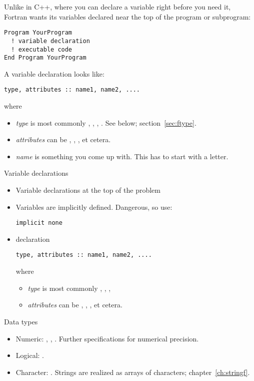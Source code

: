 Unlike in C++, where you can declare a variable right before you need
it, Fortran wants its variables declared near the top of the program
or subprogram:
\begin{verbatim}
Program YourProgram
  ! variable declaration
  ! executable code
End Program YourProgram
\end{verbatim}
A variable declaration looks like:
\begin{verbatim}
type, attributes :: name1, name2, ....
\end{verbatim}
where
\begin{itemize}
\item \textit{type} is most commonly , , ,
  . See below; section~\ref{sec:ftype}.
\item \textit{attributes} can be , ,
  ,  et cetera.
\item \textit{name} is something you come up with. This has to start
  with a letter.
\end{itemize}

\begin{slide}{Variable declarations}
  \label{sl:fvars}
  \begin{itemize}
  \item Variable declarations at the top of the problem
  \item Variables are implicitly defined. Dangerous, so use:
\begin{verbatim}
implicit none
\end{verbatim}
\item declaration
\begin{verbatim}
type, attributes :: name1, name2, ....
\end{verbatim}
where
\begin{itemize}
\item \textit{type} is most commonly , , ,
\item \textit{attributes} can be , ,
  ,  et cetera.
  \end{itemize}
\end{itemize}
\end{slide}

\begin{block}{Data types}
  \begin{itemize}
  \item Numeric: , ,
    . Further specifications for numerical precision.
  \item Logical: .
  \item Character: . Strings are realized as
    arrays of characters; chapter~\ref{ch:stringf}.
  \end{itemize}  
\end{block}

